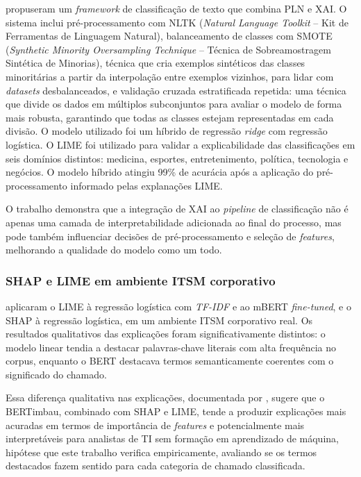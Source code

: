 \documentclass[
    12pt,                %
    openright,           %
    oneside,             %
    a4paper,             %
    english,             %
    brazil               %
]{abntex2}
\begin{document}
 propuseram um \textit{framework} de 
classificação de texto que combina PLN e XAI. O sistema inclui 
pré-processamento com NLTK (\textit{Natural Language Toolkit} -- Kit de Ferramentas de Linguagem Natural), 
balanceamento de classes com SMOTE (\textit{Synthetic Minority Oversampling Technique} -- Técnica de Sobreamostragem Sintética de Minorias), 
técnica que cria exemplos sintéticos das classes minoritárias a partir da interpolação 
entre exemplos vizinhos, para lidar com \textit{datasets} desbalanceados, 
e validação cruzada estratificada repetida: uma técnica que divide 
os dados em múltiplos subconjuntos para avaliar o modelo de forma 
mais robusta, garantindo que todas as classes estejam representadas 
em cada divisão. O modelo utilizado foi um híbrido de regressão 
\textit{ridge} com regressão logística. O LIME foi utilizado para 
validar a explicabilidade das classificações em seis domínios 
distintos: medicina, esportes, entretenimento, política, tecnologia 
e negócios. O modelo híbrido atingiu 99\% de acurácia após a 
aplicação do pré-processamento informado pelas explanações LIME.

O trabalho demonstra que a integração de XAI ao \textit{pipeline} 
de classificação não é apenas uma camada de interpretabilidade 
adicionada ao final do processo, mas pode também influenciar 
decisões de pré-processamento e seleção de \textit{features}, 
melhorando a qualidade do modelo como um todo.

\subsubsection{SHAP e LIME em ambiente ITSM corporativo}
\label{subsubsec:xai_razma}

 aplicaram o LIME à regressão logística com \textit{TF-IDF} e ao mBERT \textit{fine-tuned}, e o SHAP à regressão logística, em um ambiente ITSM corporativo real. Os resultados qualitativos das explicações foram significativamente distintos: o modelo linear tendia a destacar palavras-chave literais com alta frequência no corpus, enquanto o BERT destacava termos semanticamente coerentes com o significado do chamado.

Essa diferença qualitativa nas explicações, documentada por 
, sugere que o BERTimbau, combinado com SHAP 
e LIME, tende a produzir explicações mais acuradas em termos de 
importância de \textit{features} e potencialmente mais interpretáveis 
para analistas de TI sem formação em aprendizado de máquina, hipótese que este trabalho verifica empiricamente, 
avaliando se os termos destacados fazem sentido para cada categoria 
de chamado classificada.
\end{document}
